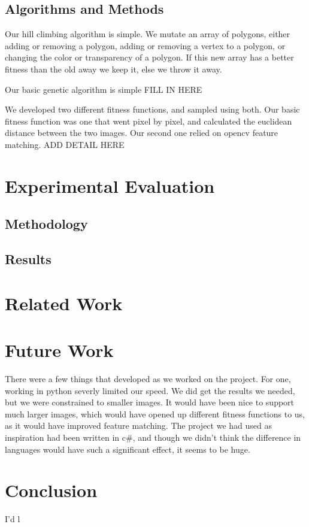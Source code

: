 \documentclass[12pt,letterpaper]{article}
\begin{document}
\subsection{Algorithms and Methods}
Our hill climbing algorithm is simple. We mutate an array of polygons, either adding or removing a polygon, adding or removing a vertex to a polygon, or changing the color or transparency of a polygon. If this new array has a better fitness than the old away we keep it, else we throw it away.

Our basic genetic algorithm is simple
FILL IN HERE

We developed two different fitness functions, and sampled using both. Our basic fitness function was one that went pixel by pixel, and calculated the euclidean distance between the two images. Our second one relied on opencv feature matching. ADD DETAIL HERE

\section{Experimental Evaluation}

\subsection{Methodology}

\subsection{Results}

\section{Related Work}

\section{Future Work}
There were a few things that developed as we worked on the project. For one, working in python severly limited our speed. We did get the results we needed, but we were constrained to smaller images. It would have been nice to support much larger images, which would have opened up different fitness functions to us, as it would have improved feature matching. The project we had used as inspiration had been written in c\#, and though we didn't think the difference in languages would have such a significant effect, it seems to be huge.

\section{Conclusion}

I'd l
\end{document}
